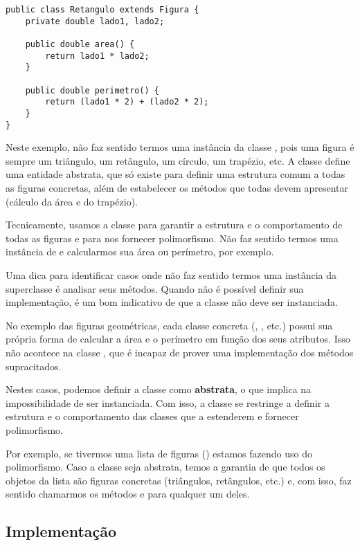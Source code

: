 \begin{verbatim}
public class Retangulo extends Figura {
	private double lado1, lado2;
	
	public double area() {
		return lado1 * lado2;
	}

	public double perimetro() {
		return (lado1 * 2) + (lado2 * 2);
	}
}
\end{verbatim}

Neste exemplo, não faz sentido termos uma instância da classe , pois uma figura é sempre um triângulo, um retângulo, um círculo, um trapézio, etc. A classe  define uma entidade abstrata, que só existe para definir uma estrutura comum a todas as figuras concretas, além de estabelecer os métodos que todas devem apresentar (cálculo da área e do trapézio).

Tecnicamente, usamos a classe  para garantir a estrutura e o comportamento de todas as figuras e para nos fornecer polimorfismo. Não faz sentido termos uma instância de  e calcularmos sua área ou perímetro, por exemplo.

Uma dica para identificar casos onde não faz sentido termos uma instância da superclasse é analisar seus métodos. Quando não é possível definir sua implementação, é um bom indicativo de que a classe não deve ser instanciada.

No exemplo das figuras geométricas, cada classe concreta (, , etc.) possui sua própria forma de calcular a área e o perímetro em função dos seus atributos. Isso não acontece na classe , que é incapaz de prover uma implementação dos métodos supracitados.

Nestes casos, podemos definir a classe como \textbf{abstrata}, o que implica na impossibilidade de ser instanciada. Com isso, a classe se restringe a definir a estrutura e o comportamento das classes que a estenderem e fornecer polimorfismo.

Por exemplo, se tivermos uma lista de figuras () estamos fazendo uso do polimorfismo. Caso a classe  seja abstrata, temos a garantia de que todos os objetos da lista são figuras concretas (triângulos, retângulos, etc.) e, com isso, faz sentido chamarmos os métodos  e  para qualquer um deles.

\subsection{Implementação}


